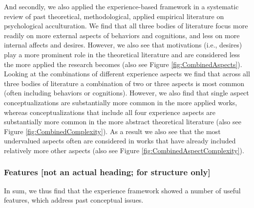 \documentclass[man, 12pt, a4paper]{apa7}
\begin{document}
And secondly, we also applied the experience-based framework in a systematic review of past theoretical, methodological, applied empirical literature on psychological acculturation. We find that all three bodies of literature focus more readily on more external aspects of behaviors and cognitions, and less on more internal affects and desires. However, we also see that motivations (i.e., desires) play a more prominent role in the theoretical literature and are considered less the more applied the research becomes (also see Figure \ref{fig:CombinedAspects}). Looking at the combinations of different experience aspects we find that across all three bodies of literature a combination of two or three aspects is most common (often including behaviors or cognitions). However, we also find that single aspect conceptualizations are substantially more common in the more applied works, whereas conceptualizations that include all four experience aspects are substantially more common in the more abstract theoretical literature (also see Figure \ref{fig:CombinedComplexity}). As a result we also see that the most undervalued aspects often are considered in works that have already included relatively more other aspects (also see Figure 
\ref{fig:CombinedAspectComplexity}). 

\subsubsection{Features [not an actual heading; for structure only]}
In sum, we thus find that the experience framework showed a number of useful features, which address past conceptual issues. 
\end{document}

